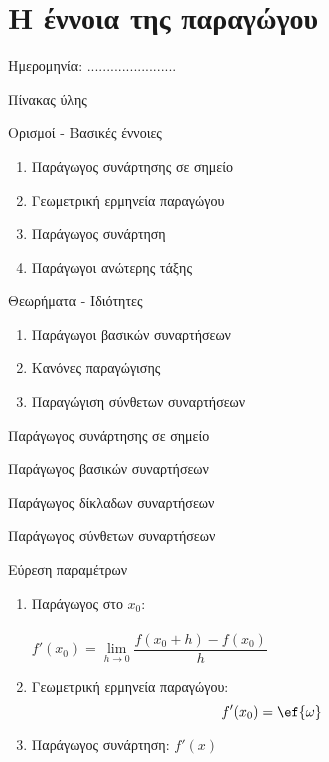 \documentclass[twoside,nofonts,internet,math,spyros]{frontisthrio}
\newcommand{\myitem}{\stepcounter{enumi}\item[\raisebox{0.5mm}{\faExclamationTriangle}\ \Large$\square$]}
\begin{document}
\section{Η έννοια της παραγώγου}
\begin{flushright}
\faCalendar* Ημερομηνία: .......................
\end{flushright}
\begin{mybox}[mysubtitle]{Πίνακας ύλης}
\begin{tcbraster}[raster columns=2,raster equal height]
\begin{myleftbox}{Ορισμοί - Βασικές έννοιες\ \ \faBook}
\begin{enumerate}[itemsep=0mm]
\item Παράγωγος συνάρτησης σε σημείο
\item Γεωμετρική ερμηνεία παραγώγου
\item Παράγωγος συνάρτηση
\item Παράγωγοι ανώτερης τάξης
\end{enumerate}
\end{myleftbox}
\begin{myrightbox}{Θεωρήματα - Ιδιότητες\ \ \faTools}
\begin{enumerate}[itemsep=0mm]
\item Παράγωγοι βασικών συναρτήσεων
\item Κανόνες παραγώγισης
\item Παραγώγιση σύνθετων συναρτήσεων
\end{enumerate}
\end{myrightbox}
\end{tcbraster}
\begin{multicols}{2}
\begin{todolist}[itemsep=0mm]
\item Παράγωγος συνάρτησης σε σημείο
\myitem Παράγωγος βασικών συναρτήσεων
\item Παράγωγος δίκλαδων συναρτήσεων
\myitem Παράγωγος σύνθετων συναρτήσεων
\item Εύρεση παραμέτρων
\end{todolist}
\end{multicols}
\begin{multicols}{2}
\begin{enumerate}[itemsep=0mm]
\item Παράγωγος στο $ x_0 $:\\\\ $ f'(x_0)=\lim\limits_{h\to 0}{\dfrac{f(x_0+h)-f(x_0)}{h}} $
\item Γεωμετρική ερμηνεία παραγώγου:
\[ f'(x_0)=\ef{\omega} \]
\item Παράγωγος συνάρτηση: $ f'(x) $
\end{enumerate}
\end{multicols}
\end{mybox}
\end{document}
